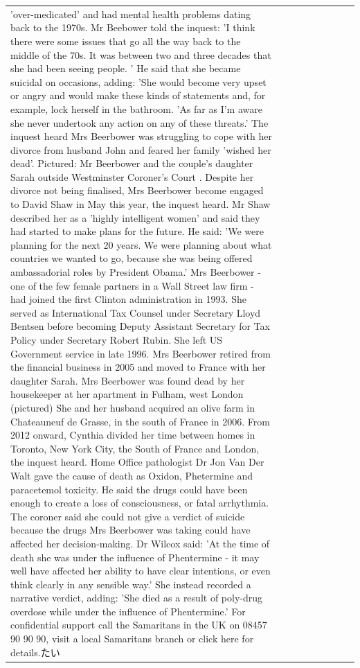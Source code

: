 \begin{table}[H]
\begin{tabular}{lllrlllll}
'over-medicated' and had mental health problems dating back to the 1970s. Mr Beebower told the inquest: 'I think there were some issues that go all the way back to the middle of the 70s. It was between two and three decades that she had been seeing people. ' He said that she became suicidal on occasions, adding: 'She would become very upset or angry and would make these kinds of statements and, for example, lock herself in the bathroom. 'As far as I'm aware she never undertook any action on any of these threats.' The inquest heard Mrs Beerbower was struggling to cope with her divorce from husband John and feared her family 'wished her dead'. Pictured: Mr Beerbower and the couple's daughter Sarah outside Westminster Coroner's Court . Despite her divorce not being finalised, Mrs Beerbower become engaged to David Shaw in May this year, the inquest heard. Mr Shaw described her as a 'highly intelligent women' and said they had started to make plans for the future. He said: 'We were planning for the next 20 years. We were planning about what countries we wanted to go, because she was being offered ambassadorial roles by President Obama.' Mrs Beerbower - one of the few female partners in a Wall Street law firm - had joined the first Clinton administration in 1993. She served as International Tax Counsel under Secretary Lloyd Bentsen before becoming Deputy Assistant Secretary for Tax Policy under Secretary Robert Rubin. She left US Government service in late 1996. Mrs Beerbower retired from the financial business in 2005 and moved to France with her daughter Sarah. Mrs Beerbower was found dead by her housekeeper at her apartment in Fulham, west London (pictured) She and her husband acquired an olive farm in Chateauneuf de Grasse, in the south of France in 2006. From 2012 onward, Cynthia divided her time between homes in Toronto, New York City, the South of France and London, the inquest heard. Home Office pathologist Dr Jon Van Der Walt gave the cause of death as Oxidon, Phetermine and paracetemol toxicity. He said the drugs could have been enough to create a loss of consciousness, or fatal arrhythmia. The coroner said she could not give a verdict of suicide because the drugs Mrs Beerbower was taking could have affected her decision-making. Dr Wilcox said: 'At the time of death she was under the influence of Phentermine - it may well have affected her ability to have clear intentions, or even think clearly in any sensible way.' She instead recorded a narrative verdict, adding: 'She died as a result of poly-drug overdose while under the influence of Phentermine.' For confidential support call the Samaritans in the UK on 08457 90 90 90, visit a local Samaritans branch or click here for details.たい \\

\end{tabular}
\end{table}
